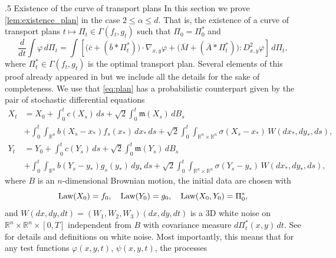 \documentclass[10pt,oneside]{amsart}
\makeatletter
\def\subsection{\@startsection{subsection}{2}%
  \z@{.5\linespacing\@plus.7\linespacing}
{.5\baselineskip}%
  {\normalfont\centering\scshape}%
}
\numberwithin{equation}{section}
\numberwithin{definition}{section}
\numberwithin{theorem}{section}
\numberwithin{lemma}{section}
\makeatother
\begin{document}
\subsection{Existence of the curve of transport plans}\label{subsec:existence_plans}
In this section we prove \cref{lem:existence_plan} in the case $2\leq \alpha \leq d$. That is, the existence of a curve of transport plans $t\mapsto \Pi_t\in \Gamma(f_t,g_t)$ such that $\Pi_0 = \Pi_0^*$ and
%
\begin{equation}\label{eq:plan}
  \frac{d}{dt}\int\varphi\,d\Pi_{t} = \int
  \left[\Big(\overline{c}+(\overline{b}*\Pi_{t}^{*})\Big)\cdot\nabla_{x,y}\varphi 
  + \Big(\overline{M}+(\overline{A}*\Pi_{t}^{*})\Big):D_{x,y}^{2}\varphi\right]\,d\Pi_{t},
\end{equation}
%
where $\Pi^*_t\in \Gamma(f_t,g_t)$ is the optimal transport plan. Several elements of this proof already appeared in \cite{fournier2009well_posedness_soft_potentials,fournier2010uniqueness_Coulomb} but we include all the details for the sake of completeness. We use that \cref{eq:plan} has a probabilistic counterpart given by the pair of stochastic differential equations
%
\begin{align}
  X_{t}&\nonumber
  =X_{0}+\int_{0}^{t}c(X_{s})\,ds+\sqrt 2\int_{0}^{t}\mathfrak m(X_{s})\,dB_s\\
  &+\int_{0}^{t}\int_{\mathbb{R}^{n}}b(X_{s}-x_{*})f_{s}(x_{*})\,dx_{*}\,ds
  +\sqrt 2\int_{0}^{t}\int_{\mathbb{R}^{n}\times\mathbb{R}^{n}}\sigma(X_{s}-x_{*})\,W(dx_{*},dy_{*},ds),
  \label{eq:SDEX}\\
  Y_{t} &\nonumber
  =Y_{0}+\int_{0}^{t}c(Y_{s})\,ds
  +\sqrt 2\int_{0}^{t}\mathfrak m(Y_{s})\,dB_s\\
  &+\int_{0}^{t}\int_{\mathbb{R}^{n}}b(Y_{s}-y_{*})g_{s}(y_{*})\,dy_{*}\,ds
  +\sqrt 2\int_{0}^{t}\int_{\mathbb{R}^{n}\times\mathbb{R}^{n}}\sigma(Y_{s}-y_{*})\,W(dx_{*},dy_{*},ds),
  \label{eq:SDEY}
\end{align}
%
where $B$ is an $n$-dimensional Brownian motion, the initial data are chosen with
%
\begin{equation*}
  \textnormal{Law}(X_{0})=f_{0},\quad\textnormal{Law}(Y_{0})=g_{0},\quad\textnormal{Law}(X_{0},Y_{0})=\Pi_{0}^{*},
\end{equation*}
%
and $W(dx,dy,dt)= (W_1,W_2,W_3)(dx,dy,dt)$ is a 3D white noise on $\mathbb{R}^{n}\times\mathbb{R}^{n}\times[0,T]$ independent from $B$ with covariance measure $d\Pi_{t}^{*}(x,y)\,dt$. See \cite{1986_Walsh_intro_SDEs} for details and definitions on white noise. Most importantly, this means that for any test functions $\varphi(x,y,t)$, $\psi(x,y,t)$, the processes
\end{document}
